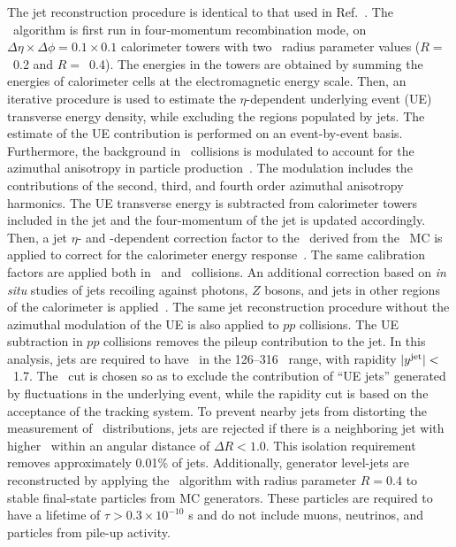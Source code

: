 
The jet reconstruction procedure is identical to that used in Ref.~\cite{2019108}.
The \antikt\ algorithm \cite{Cacciari:2008qp, Fastjet} is first run in four-momentum recombination mode, on $\Delta \eta \times \Delta \phi = 0.1\times 0.1$  calorimeter towers with two \antikt\ radius parameter values ($R=$~0.2 and $R=$~0.4).
The energies in the towers are obtained by summing the energies of calorimeter cells at the electromagnetic energy scale.
Then, an iterative procedure is used to estimate the $\eta$-dependent underlying event (UE)  transverse energy density, while excluding the regions populated by jets.
The estimate of the UE contribution is performed on an event-by-event basis.
Furthermore, the background in \pbpb\ collisions is modulated to account for the azimuthal anisotropy in particle production~\cite{ATLAS:2012at}.
The modulation includes the contributions of the second, third, and fourth order azimuthal anisotropy harmonics.
The UE transverse energy is subtracted from calorimeter towers included in the jet and the four-momentum of the jet is updated accordingly.
Then, a jet $\eta$- and \pT-dependent  correction factor to the \ptjet\ derived from the \pp\ MC is applied to correct for the calorimeter energy response~\cite{Aaboud:2017jcu}.
The same calibration factors are applied both in \pp\ and \pbpb\ collisions.
An additional correction based on \textit{in situ} studies of jets recoiling against photons, $Z$ bosons, and jets in other regions of the calorimeter is applied~\cite{ATL-PHYS-PUB-2015-036,2019167}.
The same jet reconstruction procedure without the azimuthal modulation of the UE is also applied to $pp$ collisions.
The UE subtraction in $pp$ collisions removes the pileup contribution to the jet.
In this analysis, jets are required to have \ptjet\ in the 126--316 \GeV\ range, with rapidity  $|\mbox{$y^{\mathrm{jet}}$}|<$~1.7.
The \ptjet\ cut is chosen so as to exclude the contribution of ``UE jets'' generated by fluctuations in the underlying event, while the rapidity cut is based on the acceptance of the tracking system.	  
To prevent nearby jets from distorting the measurement of \Dptr\ distributions, jets are rejected if there is a neighboring jet with higher \ptjet\ within an angular distance of $\Delta R < 1.0$.
This isolation requirement removes approximately 0.01\% of jets.
Additionally, generator level-jets are reconstructed by applying the \antikt\ algorithm with radius parameter $R=0.4$ to stable final-state particles from MC generators.
These particles are required to have a lifetime of $\tau>0.3\times 10^{-10}$ s and do not include muons, neutrinos, and particles from pile-up activity.

